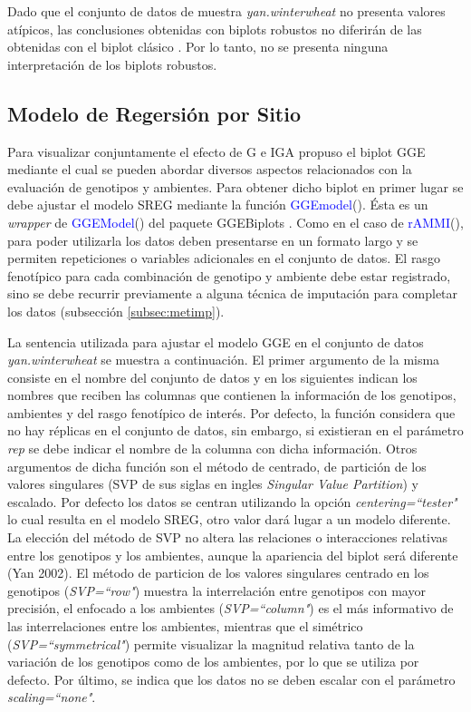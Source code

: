 Dado que el conjunto de datos de muestra \emph{yan.winterwheat} no presenta valores atípicos, las conclusiones obtenidas con biplots robustos no diferirán de las obtenidas con el biplot clásico \citep{Rodriguesetal2016}. Por lo tanto, no se presenta ninguna interpretación de los biplots robustos. \\


\subsection{Modelo de Regersión por Sitio}
\label{subsec:SREGpaquete}
Para visualizar conjuntamente el efecto de G e IGA \citet{Yanetal2000} propuso el biplot GGE mediante el cual se pueden abordar diversos aspectos relacionados con la evaluación de genotipos y ambientes. Para obtener dicho biplot en primer lugar se debe ajustar el modelo SREG mediante la función \textcolor{blue}{GGEmodel}(). Ésta es un \emph{wrapper} de \textcolor{blue}{GGEModel}() del paquete GGEBiplots \citep{Dumble2017}. Como en el caso de \textcolor{blue}{rAMMI}(), para poder utilizarla los datos deben presentarse en un formato largo y se permiten repeticiones o variables adicionales en el conjunto de datos. El rasgo fenotípico para cada combinación de genotipo y ambiente debe estar registrado, sino se debe recurrir previamente a alguna técnica de imputación para completar los datos (subsección  \ref{subsec:metimp}). 

La sentencia utilizada para ajustar el modelo GGE en el conjunto de datos \emph{yan.winterwheat} se muestra a continuación. El primer argumento de la misma consiste en el nombre del conjunto de datos y en los siguientes indican los nombres que reciben las columnas que contienen la información de los genotipos, ambientes y del rasgo fenotípico de interés. Por defecto, la función considera que no hay réplicas en el conjunto de datos, sin embargo, si existieran en el parámetro \emph{rep} se debe indicar el nombre de la columna con dicha información. Otros argumentos de dicha función son el método de centrado, de partición de los valores singulares (SVP de sus siglas en ingles \emph{Singular Value Partition}) y escalado. Por defecto los datos se centran utilizando la opción \emph{centering=``tester"} lo cual resulta en el modelo SREG, otro valor dará lugar a un modelo diferente. La elección del método de SVP no altera las relaciones o interacciones relativas entre los genotipos y los ambientes, aunque la apariencia del biplot será diferente (Yan 2002). El método de particion de los valores singulares centrado en los genotipos (\emph{SVP=``row"}) muestra la interrelación entre genotipos con mayor precisión, el enfocado a los ambientes (\emph{SVP=``column"}) es el más informativo de las interrelaciones entre los ambientes, mientras que el simétrico (\emph{SVP=``symmetrical"}) permite visualizar la magnitud relativa tanto de la variación de los genotipos como de los ambientes, por lo que se utiliza por defecto. Por último, se indica que los datos no se deben escalar con el parámetro \emph{scaling=``none"}. \\

